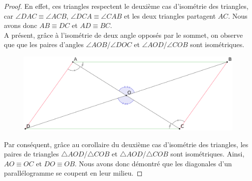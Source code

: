 \documentclass[a4paper,12pt]{article}
\begin{document}
\begin{proof}
En effet, ces triangles respectent le deuxième cas d'isométrie des triangles, car $\angle DAC \equiv \angle ACB$, $\angle DCA \equiv \angle CAB$ et les deux triangles partagent $AC$. Nous avons donc $AB \equiv DC$ et $AD \equiv BC$.\\

A présent, grâce à l'isométrie de deux angle opposés par le sommet, on observe que que les paires d'angles $\angle AOB$/$\angle DOC$ et $\angle AOD$/$\angle COB$ sont isométriques. 

\begin{figure}[H]
        \centering
        \includegraphics[scale=0.2]{parallelogram3.eps}
    \end{figure}

Par conséquent, grâce au corollaire du deuxième cas d'isométrie des triangles, les paires de triangles $\triangle AOD$/$\triangle COB$ et $\triangle AOD$/$\triangle COB$ sont isométriques. Ainsi, $AO \equiv OC$ et $DO \equiv OB$. Nous avons donc démontré que les diagonales d'un parallélogramme se coupent en leur milieu.
\end{proof}
\end{document}
